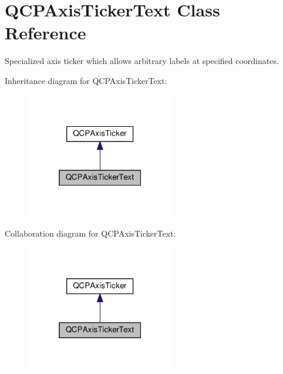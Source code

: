 \hypertarget{classQCPAxisTickerText}{}\section{Q\+C\+P\+Axis\+Ticker\+Text Class Reference}
\label{classQCPAxisTickerText}


Specialized axis ticker which allows arbitrary labels at specified coordinates.  




Inheritance diagram for Q\+C\+P\+Axis\+Ticker\+Text\+:\nopagebreak
\begin{figure}[H]
\begin{center}
\leavevmode
\includegraphics[width=184pt]{classQCPAxisTickerText__inherit__graph}
\end{center}
\end{figure}


Collaboration diagram for Q\+C\+P\+Axis\+Ticker\+Text\+:\nopagebreak
\begin{figure}[H]
\begin{center}
\leavevmode
\includegraphics[width=184pt]{classQCPAxisTickerText__coll__graph}
\end{center}
\end{figure}

